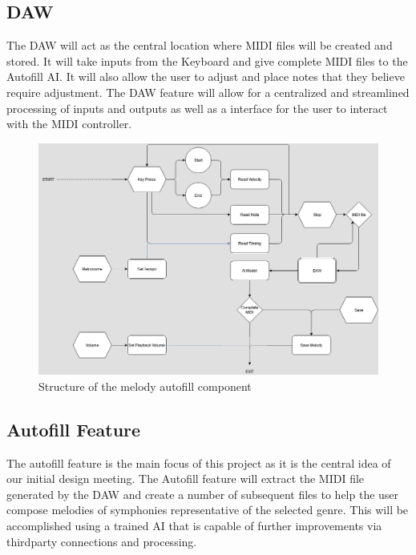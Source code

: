 \newpage
\subsection{DAW}

The DAW will act as the central location where MIDI files will be created and stored. It
will take inputs from the Keyboard and give complete MIDI files to the Autofill AI. It
will also allow the user to adjust and place notes that they believe require adjustment.
The DAW feature will allow for a centralized and streamlined processing of inputs and
outputs as well as a interface for the user to interact with the MIDI controller.

\begin{figure}[h!]
  \centering
  \includegraphics[width=\linewidth]{image/Autofill.png}
  \caption{Structure of the melody autofill component}
  \label{fig:autofill_diagram}
\end{figure}

\newpage
\subsection{Autofill Feature}

The autofill feature is the main focus of this project as it is the central idea of our
initial design meeting. The Autofill feature will extract the MIDI file generated by the
DAW and create a number of subsequent files to help the user compose melodies of
symphonies representative of the selected genre. This will be accomplished using a trained
AI that is capable of further improvements via thirdparty connections and processing.

